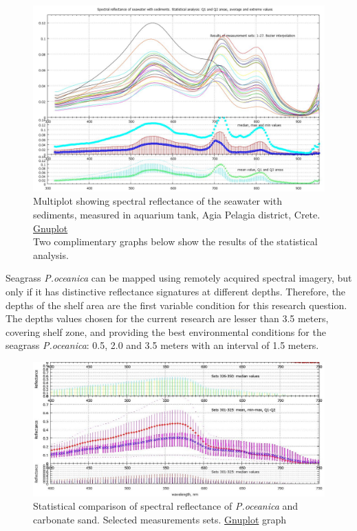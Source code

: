 \documentclass[10pt, a4paper]{article}
\begin{document}
\begin{figure}[H]
	\centering
	\includegraphics[scale=0.27]{GNU-18.jpg}
	\caption{Multiplot showing spectral reflectance of the seawater with sediments, measured in aquarium tank, Agia Pelagia district, Crete. \href{http://www.gnuplot.info/}{Gnuplot} \\Two complimentary graphs below show the results of the statistical analysis.}
	\label{fig:4.4}
\end{figure}

Seagrass \textit{P.oceanica} can be mapped using remotely acquired spectral imagery, but only if it has distinctive
reflectance signatures at different depths. Therefore, the depths of the shelf area are the first variable
condition for this research question. The depths values chosen for the current research are lesser than
3.5 meters, covering shelf zone, and providing the best environmental conditions for the seagrass
\textit{P.oceanica}: 0.5, 2.0 and 3.5 meters with an interval of 1.5 meters. 

\begin{figure}[H]
	\centering
	\includegraphics[scale=0.3]{GNU-20-new.jpg}
	\caption{Statistical comparison of spectral reflectance of \textit{P.oceanica} and carbonate sand. Selected measurements sets. \href{http://www.gnuplot.info/}{Gnuplot} graph}
	\label{fig:28}
\end{figure}
\end{document}
